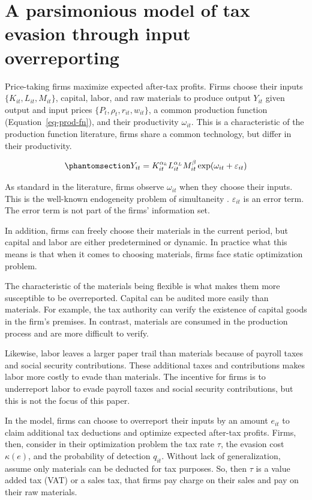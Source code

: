 \documentclass[
  12pt]{article}
\theoremstyle{definition}
\theoremstyle{remark}
\begin{document}
\section{A parsimonious model of tax evasion through input
overreporting}\label{a-parsimonious-model-of-tax-evasion-through-input-overreporting}

Price-taking firms maximize expected after-tax profits. Firms choose
their inputs \(\{K_{it},L_{it},M_{it}\}\), capital, labor, and raw
materials to produce output \(Y_{it}\) given output and input prices
\(\{P_{t}, \rho_t, r_{it}, w_{it}\}\), a common production function
(Equation~\ref{eq-prod-fn}), and their productivity \(\omega_{it}\).
This is a characteristic of the production function literature, firms
share a common technology, but differ in their productivity.

\begin{equation}\phantomsection\label{eq-prod-fn}{
Y_{it}=K_{it}^{\alpha_k}L_{it}^{\alpha_L}M_{it}^{\beta}\exp(\omega_{it}+\varepsilon_{it})
}\end{equation}

As standard in the literature, firms observe \(\omega_{it}\) when they
choose their inputs. This is the well-known endogeneity problem of
simultaneity \citep{Griliches1995}. \(\varepsilon_{it}\) is an error
term. The error term is not part of the firms' information set.

In addition, firms can freely choose their materials in the current
period, but capital and labor are either predetermined or dynamic. In
practice what this means is that when it comes to choosing materials,
firms face static optimization problem.

The characteristic of the materials being flexible is what makes them
more susceptible to be overreported. Capital can be audited more easily
than materials. For example, the tax authority can verify the existence
of capital goods in the firm's premises. In contrast, materials are
consumed in the production process and are more difficult to verify.

Likewise, labor leaves a larger paper trail than materials because of
payroll taxes and social security contributions. These additional taxes
and contributions makes labor more costly to evade than materials. The
incentive for firms is to underreport labor to evade payroll taxes and
social security contributions, but this is not the focus of this paper.

In the model, firms can choose to overreport their inputs by an amount
\(e_{it}\) to claim additional tax deductions and optimize expected
after-tax profits. Firms, then, consider in their optimization problem
the tax rate \(\tau\), the evasion cost \(\kappa(e)\), and the
probability of detection \(q_{it}\). Without lack of generalization,
assume only materials can be deducted for tax purposes. So, then
\(\tau\) is a value added tax (VAT) or a sales tax, that firms pay
charge on their sales and pay on their raw materials.
\end{document}
